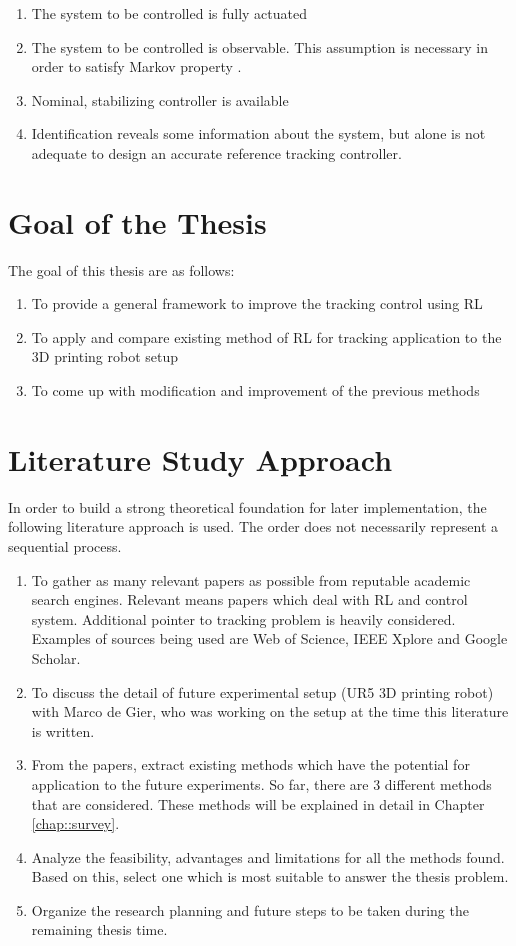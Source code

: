 \begin{enumerate}
	\item The system to be controlled is fully actuated
	\item The system to be controlled is observable. This assumption is necessary in order to satisfy Markov property \cite{sutton1998reinforcement}.
	\item Nominal, stabilizing controller is available	
	\item Identification reveals some information about the system, but alone is not adequate to design an accurate reference tracking controller.
\end{enumerate}

\section{Goal of the Thesis}

The goal of this thesis are as follows:
\begin{enumerate}
\item To provide a general framework to improve the tracking control using \ac{RL}
\item To apply and compare existing method of \ac{RL} for tracking application to the 3D printing robot setup
\item To come up with modification and improvement of the previous methods
\end{enumerate}

\section{Literature Study Approach}
In order to build a strong theoretical foundation for later implementation, the following literature approach is used. The order does not necessarily represent a sequential process.
\begin{enumerate}
	\item To gather as many relevant papers as possible from reputable academic search engines. Relevant means papers which deal with \ac{RL} and control system. Additional pointer to tracking problem is heavily considered. Examples of sources being used are Web of Science, IEEE Xplore and Google Scholar.
	\item To discuss the detail of future experimental setup (UR5 \ac{3D} printing robot) with Marco de Gier, who was working on the setup at the time this literature is written.
	\item From the papers, extract existing methods which have the potential for application to the future experiments. So far, there are 3 different methods that are considered. These methods will be explained in detail in Chapter \ref{chap::survey}.
	\item Analyze the feasibility, advantages and limitations for all the methods found. Based on this, select one which is most suitable to answer the thesis problem.
	\item Organize the research planning and future steps to be taken during the remaining thesis time.
	
\end{enumerate}


